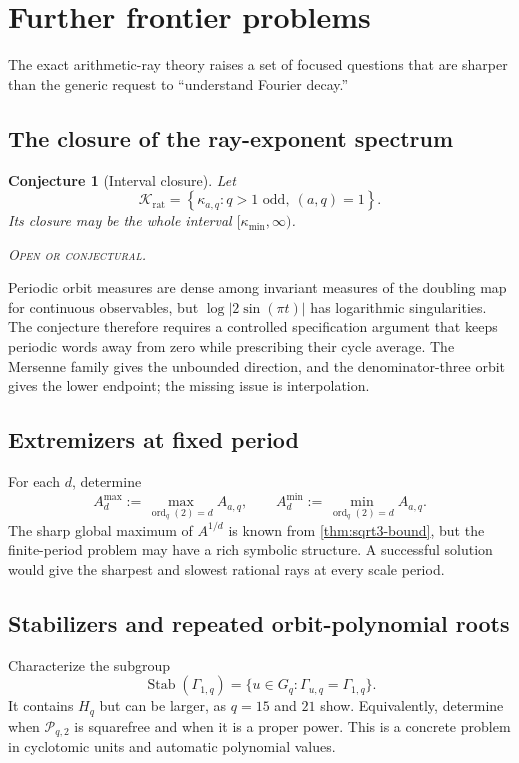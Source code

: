 \documentclass[11pt,oneside]{article}
\newtheorem{conjecture}[theorem]{Conjecture}
\theoremstyle{definition}
\theoremstyle{remark}
\newcommand{\ord}{\operatorname{ord}}
\newcommand{\openstatus}{\textcolor{conjectureorange}{\textsc{Open or conjectural.}}}
\begin{document}
\section{Further frontier problems}\label{sec:open}

The exact arithmetic-ray theory raises a set of focused questions that are sharper
than the generic request to ``understand Fourier decay.''

\subsection{The closure of the ray-exponent spectrum}

\begin{conjecture}[Interval closure]
Let
\[
 \mathcal K_{\mathrm{rat}}=
 \left\{\kappa_{a,q}:q>1\text{ odd},\ (a,q)=1\right\}.
\]
Its closure may be the whole interval $[\kappa_{\min},\infty)$.

\smallskip\noindent\openstatus
\end{conjecture}

Periodic orbit measures are dense among invariant measures of the doubling map for
continuous observables, but $\log|2\sin(\pi t)|$ has logarithmic singularities. The
conjecture therefore requires a controlled specification argument that keeps
periodic words away from zero while prescribing their cycle average. The Mersenne
family gives the unbounded direction, and the denominator-three orbit gives the
lower endpoint; the missing issue is interpolation.

\subsection{Extremizers at fixed period}

For each $d$, determine
\[
 A_d^{\max}:=\max_{\ord_q(2)=d}A_{a,q},
 \qquad
 A_d^{\min}:=\min_{\ord_q(2)=d}A_{a,q}.
\]
The sharp global maximum of $A^{1/d}$ is known from \cref{thm:sqrt3-bound}, but the
finite-period problem may have a rich symbolic structure. A successful solution
would give the sharpest and slowest rational rays at every scale period.

\subsection{Stabilizers and repeated orbit-polynomial roots}

Characterize the subgroup
\[
 \operatorname{Stab}(\Gamma_{1,q})
 =\{u\in G_q:\Gamma_{u,q}=\Gamma_{1,q}\}.
\]
It contains $H_q$ but can be larger, as $q=15$ and $21$ show. Equivalently, determine
when $\mathscr P_{q,2}$ is squarefree and when it is a proper power. This is a
concrete problem in cyclotomic units and automatic polynomial values.
\end{document}
